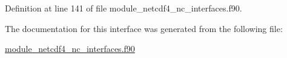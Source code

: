 Definition at line 141 of file module\+\_\+netcdf4\+\_\+nc\+\_\+interfaces.\+f90.



The documentation for this interface was generated from the following file\+:\begin{DoxyCompactItemize}
\item 
\hyperlink{module__netcdf4__nc__interfaces_8f90}{module\+\_\+netcdf4\+\_\+nc\+\_\+interfaces.\+f90}\end{DoxyCompactItemize}
